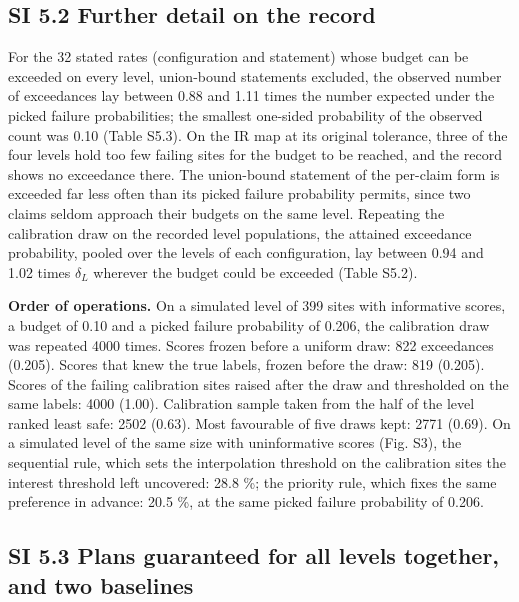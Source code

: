 \documentclass{iopjournal}
\begin{document}
\hypertarget{si-5.2-further-detail-on-the-record}{%
\subsection*{SI 5.2 Further detail on the record}\label{si-5.2-further-detail-on-the-record}}

For the 32 stated rates (configuration and statement) whose budget can be exceeded on every level, union-bound statements excluded, the observed number of exceedances lay between 0.88 and 1.11 times the number expected under the picked failure probabilities; the smallest one-sided probability of the observed count was 0.10 (Table S5.3). On the IR map at its original tolerance, three of the four levels hold too few failing sites for the budget to be reached, and the record shows no exceedance there. The union-bound statement of the per-claim form is exceeded far less often than its picked failure probability permits, since two claims seldom approach their budgets on the same level. Repeating the calibration draw on the recorded level populations, the attained exceedance probability, pooled over the levels of each configuration, lay between 0.94 and 1.02 times \(\delta_L\) wherever the budget could be exceeded (Table S5.2).

\textbf{Order of operations.} On a simulated level of 399 sites with informative scores, a budget of 0.10 and a picked failure probability of 0.206, the calibration draw was repeated 4000 times. Scores frozen before a uniform draw: 822 exceedances (0.205). Scores that knew the true labels, frozen before the draw: 819 (0.205). Scores of the failing calibration sites raised after the draw and thresholded on the same labels: 4000 (1.00). Calibration sample taken from the half of the level ranked least safe: 2502 (0.63). Most favourable of five draws kept: 2771 (0.69). On a simulated level of the same size with uninformative scores (Fig. S3), the sequential rule, which sets the interpolation threshold on the calibration sites the interest threshold left uncovered: 28.8 \%; the priority rule, which fixes the same preference in advance: 20.5 \%, at the same picked failure probability of 0.206.

\hypertarget{si-5.3-plans-guaranteed-for-all-levels-together-and-two-baselines}{%
\subsection*{SI 5.3 Plans guaranteed for all levels together, and two baselines}\label{si-5.3-plans-guaranteed-for-all-levels-together-and-two-baselines}}
\end{document}
